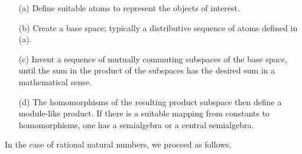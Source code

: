 \documentclass[11pt]{article}
\begin{document}
 \begin{itemize}
 \item[(a)]{Define suitable atoms to represent the objects of interest.}
 \item[(b)]{Create a base space; typically a distributive sequence of atoms defined in (a).} 
 \item[(c)]{Invent a sequence of mutually commuting subspaces of the base space, until the sum in the product of the subspaces has 
 the desired sum in a mathematical sense.}
 \item[(d)]{The homomorphisms of the resulting product subspace then define a module-like product.  If there is a suitable mapping 
 from constants to homomorphisms, one has a semialgebra or a central semialgebra.}
 \end{itemize}
 In the case of rational natural numbers, we proceed as follows.
\end{document}
